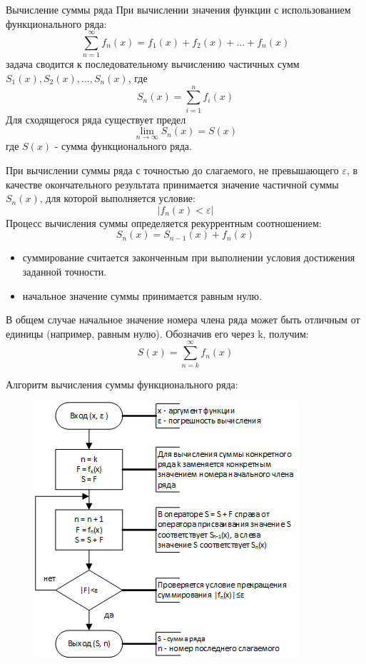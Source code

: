 \documentclass{beamer}
\begin{document}
\begin{frame}{Вычисление суммы ряда}
При вычислении значения функции с использованием функционального ряда:
\[\sum\limits_{n=1}^\infty f_n(x)=f_1(x)+f_2(x)+...+f_n(x)\]
задача сводится к последовательному вычислению частичных сумм $S_1(x), S_2(x),..., S_n(x)$, где 
\[S_n(x)=\sum\limits_{i=1}^n f_i(x)\]
Для сходящегося ряда существует предел 
\[\lim\limits_{n\to \infty} S_n(x)=S(x)\]
где $S(x)$ - сумма функционального ряда.
\end{frame}

\begin{frame}
При вычислении суммы ряда с точностью до слагаемого, не превышающего $\varepsilon$, в качестве окончательного результата принимается значение частичной суммы $S_n(x)$, для которой выполняется условие:
\[|f_n(x)<\varepsilon|\]
Процесс вычисления суммы определяется рекуррентным соотношением:
\[S_n(x)=S_{n-1}(x)+f_n(x)\]
\begin{itemize}
\item суммирование считается законченным при выполнении условия достижения заданной точности. 
\item начальное значение суммы принимается равным нулю.
\end{itemize}
В общем случае начальное значение номера члена ряда может быть отличным от единицы (например, равным нулю). Обозначив его через k, получим:
\[S(x)=\sum\limits_{n=k}^\infty f_n(x)\]
\end{frame}

\begin{frame}
Алгоритм вычисления суммы функционального ряда:
\begin{figure}[h]
\centering
\includegraphics[scale=0.75]{images/lec05-pic03.png}
\end{figure}
\end{frame} 
\end{document}

